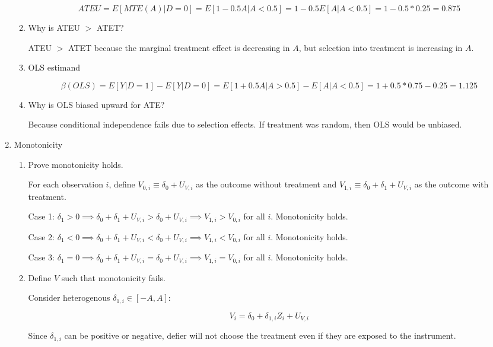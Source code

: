 \documentclass{article}
\begin{document}
\begin{enumerate}
\begin{enumerate}
$$
ATEU = E[MTE(A) | D = 0] = E[1- 0.5A | A < 0.5] = 1- 0.5 E[A | A < 0.5] = 1 - 0.5*0.25 = 0.875
$$

\item Why is ATEU $>$ ATET?

ATEU $>$ ATET because the marginal treatment effect is decreasing in $A$, but selection into treatment is increasing in $A$.

\item OLS estimand

$$
\beta(OLS) = E[Y|D=1] - E[Y|D=0] = E[1 + 0.5A |A > 0.5] - E[A|A < 0.5] = 1 + 0.5 *0.75 - 0.25 = 1.125
$$

\item Why is OLS biased upward for ATE?

Because conditional independence fails due to selection effects.  If treatment was random, then OLS would be unbiased.

\end{enumerate}

\item Monotonicity

\begin{enumerate}

\item Prove monotonicity holds.

For each observation $i$, define $V_{0,i} \equiv \delta_0 + U_{V,i}$ as the outcome without treatment and $V_{1,i} \equiv \delta_0 + \delta_1 + U_{V,i}$ as the outcome with treatment.

Case 1: $\delta_1 > 0 \implies \delta_0 + \delta_1 + U_{V,i} > \delta_0 + U_{V,i} \implies V_{1,i} > V_{0,i}$ for all $i$. Monotonicity holds.

Case 2: $\delta_1 < 0 \implies \delta_0 + \delta_1 + U_{V,i} < \delta_0 + U_{V,i} \implies V_{1,i} < V_{0,i}$ for all $i$. Monotonicity holds.

Case 3: $\delta_1 = 0 \implies\delta_0 + \delta_1 + U_{V,i} = \delta_0 + U_{V,i} \implies V_{1,i} = V_{0,i}$ for all $i$. Monotonicity holds.

\item Define $V$ such that monotonicity fails.

Consider heterogenous $\delta_{1,i} \in [-A, A]$:

$$
V_i = \delta_0 + \delta_{1,i} Z_i + U_{V, i}
$$

Since $\delta_{1,i}$ can be positive or negative, defier will not choose the treatment even if they are exposed to the instrument.


\end{enumerate}
\end{enumerate}
\end{document}
